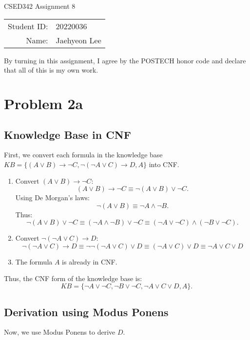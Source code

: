 \documentclass[12pt]{article}
\begin{document}
\begin{center}
{\Large CSED342 Assignment 8 \vspace{10pt}}

\begin{tabular}{rl}
Student ID: & 20220036 \\
Name: & Jaehyeon Lee \\
\end{tabular}
\end{center}

\begin{center}
By turning in this assignment, I agree by the POSTECH honor code and declare that all of this is my own work.
\end{center}

\section*{Problem 2a}

\subsection*{Knowledge Base in CNF}
First, we convert each formula in the knowledge base \( KB = \{(A \lor B) \rightarrow \neg C, \neg(\neg A \lor C) \rightarrow D, A\} \) into CNF.

\begin{enumerate}
    \item Convert \((A \lor B) \rightarrow \neg C\):
    \[
    (A \lor B) \rightarrow \neg C \equiv \neg (A \lor B) \lor \neg C.
    \]
    Using De Morgan's laws:
    \[
    \neg (A \lor B) \equiv \neg A \land \neg B.
    \]
    Thus:
    \[
    \neg (A \lor B) \lor \neg C \equiv (\neg A \land \neg B) \lor \neg C \equiv (\neg A \lor \neg C) \land (\neg B \lor \neg C).
    \]
    \item Convert \(\neg(\neg A \lor C) \rightarrow D\):
    \[
    \neg(\neg A \lor C) \rightarrow D \equiv \neg \neg(\neg A \lor C) \lor D \equiv (\neg A \lor C) \lor D \equiv \neg A \lor C \lor D
    \]
    \item The formula \(A\) is already in CNF.
\end{enumerate}

Thus, the CNF form of the knowledge base is:
\[
KB = \{\neg A \lor \neg C, \neg B \lor \neg C, \neg A \lor C \lor D, A\}.
\]

\subsection*{Derivation using Modus Ponens}
Now, we use Modus Ponens to derive \(D\).
\end{document}
